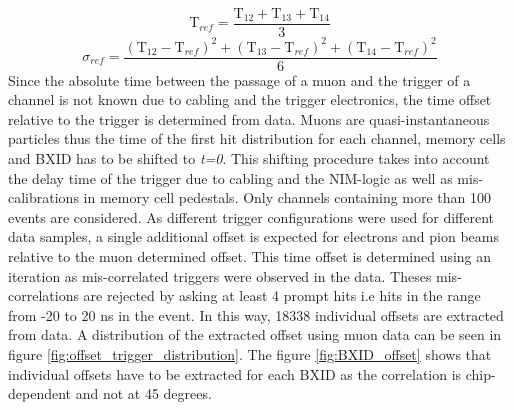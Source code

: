 \documentclass[twoside,a4paper,11pt]{article}
\begin{document}
\begin{equation} \label{eq:tref}
\text{T}_{ref} = \frac{\text{T}_{12} + \text{T}_{13} + \text{T}_{14}}{3}
\end{equation}
\begin{equation} \label{eq:tref_err}
\sigma_{ref} = \frac{ (\text{T}_{12} - \text{T}_{ref})^2 + (\text{T}_{13} - \text{T}_{ref})^2  + (\text{T}_{14} - \text{T}_{ref})^2 }{6}
\end{equation}
Since the absolute time between the passage of a muon and the trigger of a channel is not known due to cabling and the trigger electronics, the time offset relative to the trigger is determined from data. Muons are quasi-instantaneous particles thus the time of the first hit distribution for each channel, memory cells and BXID has to be shifted to \textit{t=0}. This shifting procedure takes into account the delay time of the trigger due to cabling and the NIM-logic as well as mis-calibrations in memory cell pedestals. Only channels containing more than 100 events are considered. As different trigger configurations were used for different data samples, a single additional offset is expected for electrons and pion beams relative to the muon determined offset. This time offset is determined using an iteration as mis-correlated triggers were observed in the data. Theses mis-correlations are rejected by asking at least 4 prompt hits i.e hits in the range from -20 to 20 ns in the event. In this way, 18338 individual offsets are extracted from data. A distribution of the extracted offset using muon data can be seen in figure \ref{fig:offset_trigger_distribution}. The figure \ref{fig:BXID_offset} shows that individual offsets have to be extracted for each BXID as the correlation is chip-dependent and not at 45 degrees.
\end{document}

